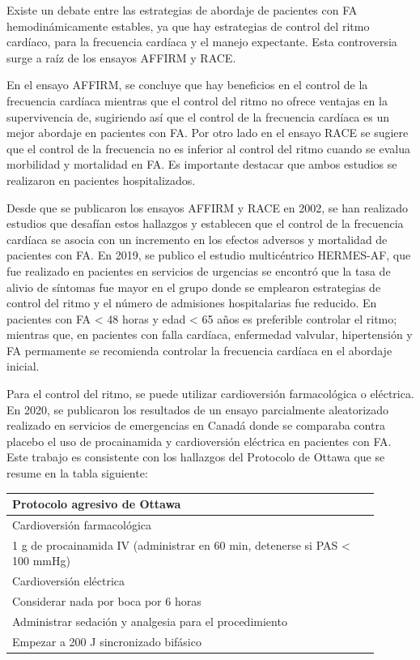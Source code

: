 \documentclass[a4paper]{article}
\let\cite=\supercite
\begin{document}
\begin{multicols}{3}
Existe un debate entre las estrategias de abordaje de pacientes con FA
hemodinámicamente estables, ya que hay estrategias de control del ritmo
cardíaco, para la frecuencia cardíaca y el manejo expectante. Esta
controversia surge a raíz de los ensayos AFFIRM\cite{AFFIRM} y RACE\cite{RACE}.

En el ensayo AFFIRM, se concluye que hay beneficios en el control de la
frecuencia cardíaca mientras que el control del ritmo no ofrece ventajas en la
supervivencia de, sugiriendo así que el control de la frecuencia cardíaca es un
mejor abordaje en pacientes con FA. Por otro lado en el ensayo RACE se sugiere
que el control de la frecuencia no es inferior al control del ritmo cuando se
evalua morbilidad y mortalidad en FA. Es importante destacar que ambos estudios
se realizaron en pacientes hospitalizados.

Desde que se publicaron los ensayos AFFIRM y RACE en 2002, se han realizado
estudios que desafían estos hallazgos y establecen que el control de la
frecuencia cardíaca se asocia con un incremento en los efectos adversos y
mortalidad de pacientes con FA\cite{malya}. En 2019, se publico el estudio
multicéntrico HERMES-AF, que fue realizado en pacientes en servicios de
urgencias se encontró que la tasa de alivio de síntomas fue mayor en el grupo
donde se emplearon estrategias de control del ritmo y el número de admisiones
hospitalarias fue reducido\cite{HERMESAF}. En pacientes con FA < 48 horas y
edad < 65 años es preferible controlar el ritmo; mientras que, en pacientes con
falla cardíaca, enfermedad valvular, hipertensión y FA permamente se recomienda
controlar la frecuencia cardíaca en el abordaje inicial\cite{malya}.

Para el control del ritmo, se puede utilizar cardioversión farmacológica o
eléctrica. En 2020, se publicaron los resultados de un ensayo parcialmente
aleatorizado realizado en servicios de emergencias en Canadá donde se comparaba
contra placebo el uso de procainamida y cardioversión eléctrica en pacientes
con FA\cite{OTTAWA}. Este trabajo es consistente con los hallazgos del
Protocolo de Ottawa que se resume en la tabla siguiente:

\begin{center}
  \footnotesize
  \centering
  \begin{tabular}{ p{0.9\linewidth} }
    \textbf{Protocolo agresivo de Ottawa} \\
    \hline
    \cellcolor[HTML]{CCCCCC} Cardioversión farmacológica \\
    \hline
    1 g de procainamida IV (administrar en 60 min, detenerse si PAS < 100 mmHg) \\
    \hline
    \cellcolor[HTML]{CCCCCC} Cardioversión eléctrica \\
    \hline
    Considerar nada por boca por 6 horas \\
    Administrar sedación y analgesia para el procedimiento  \\
    Empezar a 200 J sincronizado bifásico \\
  \end{tabular}
\end{center}


\end{multicols}
\end{document}
